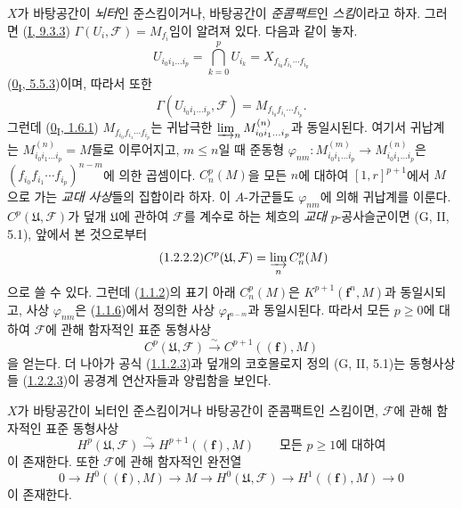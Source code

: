 \begin{env}[1.2.2]
\label{III.1.2.2-fr}
$X$가 바탕공간이 \emph{뇌터}인 준스킴이거나, 바탕공간이
\emph{준콤팩트}인 \emph{스킴}이라고 하자. 그러면
(\hyperref[I.9.3.3-ko]{I, 9.3.3}) $\Gamma(U_i,\mathcal F)=M_{f_i}$임이
알려져 있다. 다음과 같이 놓자.
\[
U_{i_0i_1\ldots i_p}=\bigcap_{k=0}^p U_{i_k}
=X_{f_{i_0}f_{i_1}\cdots f_{i_p}}
\]
(\hyperref[0.5.5.3-ko]{0\textsubscript{I}, 5.5.3})이며, 따라서 또한
\begin{equation}
\label{III.1.2.2.1-fr}
\tag{1.2.2.1}
\Gamma(U_{i_0i_1\ldots i_p},\mathcal F)=M_{f_{i_0}f_{i_1}\cdots f_{i_p}}.
\end{equation}
그런데 (\hyperref[0.1.6.1-ko]{0\textsubscript{I}, 1.6.1})
$M_{f_{i_0}f_{i_1}\cdots f_{i_p}}$는 귀납극한
$\varinjlim_n M_{i_0i_1\ldots i_p}^{(n)}$과 동일시된다. 여기서 귀납계는
$M_{i_0i_1\ldots i_p}^{(n)}=M$들로 이루어지고, $m\leq n$일 때 준동형
$\varphi_{nm}:M_{i_0i_1\ldots i_p}^{(m)}\to
M_{i_0i_1\ldots i_p}^{(n)}$은
$(f_{i_0}f_{i_1}\cdots f_{i_p})^{n-m}$에 의한 곱셈이다. $C_n^p(M)$을
모든 $n$에 대하여 $[1,r]^{p+1}$에서 $M$으로 가는 \emph{교대 사상}들의
집합이라 하자. 이 $A$-가군들도 $\varphi_{nm}$에 의해 귀납계를 이룬다.
$C^p(\mathfrak U,\mathcal F)$가 덮개 $\mathfrak U$에 관하여
$\mathcal F$를 계수로 하는 체흐의 \emph{교대} $p$-공사슬군이면
(G, II, 5.1), 앞에서 본 것으로부터
\begin{equation}
\label{III.1.2.2.2-fr}
\tag{1.2.2.2}
C^p(\mathfrak U,\mathcal F)=\varinjlim_n C_n^p(M)
\end{equation}
으로 쓸 수 있다. 그런데 (\hyperref[III.1.1.2-fr]{1.1.2})의 표기 아래
$C_n^p(M)$은 $K^{p+1}(\mathbf f^n,M)$과 동일시되고, 사상
$\varphi_{nm}$은 (\hyperref[III.1.1.6-fr]{1.1.6})에서 정의한 사상
$\varphi_{\mathbf f^{n-m}}$과 동일시된다. 따라서 모든 $p\geq0$에 대하여
$\mathcal F$에 관해 함자적인 표준 동형사상
\begin{equation}
\label{III.1.2.2.3-fr}
\tag{1.2.2.3}
C^p(\mathfrak U,\mathcal F)\xrightarrow{\sim}C^{p+1}((\mathbf f),M)
\end{equation}
을 얻는다. 더 나아가 공식 (\hyperref[III.1.1.2.3-fr]{1.1.2.3})과 덮개의
코호몰로지 정의 (G, II, 5.1)는 동형사상들
(\hyperref[III.1.2.2.3-fr]{1.2.2.3})이 공경계 연산자들과 양립함을 보인다.
\end{env}

\begin{proposition}[1.2.3]
\label{III.1.2.3-fr}
$X$가 바탕공간이 뇌터인 준스킴이거나 바탕공간이 준콤팩트인 스킴이면,
$\mathcal F$에 관해 함자적인 표준 동형사상
\begin{equation}
\label{III.1.2.3.1-fr}
\tag{1.2.3.1}
H^p(\mathfrak U,\mathcal F)\xrightarrow{\sim}H^{p+1}((\mathbf f),M)
\qquad\text{모든 }p\geq1\text{에 대하여}
\end{equation}
이 존재한다. 또한 $\mathcal F$에 관해 함자적인 완전열
\begin{equation}
\label{III.1.2.3.2-fr}
\tag{1.2.3.2}
0\longrightarrow H^0((\mathbf f),M)\longrightarrow M
\longrightarrow H^0(\mathfrak U,\mathcal F)
\longrightarrow H^1((\mathbf f),M)\longrightarrow0
\end{equation}
이 존재한다.
\end{proposition}

